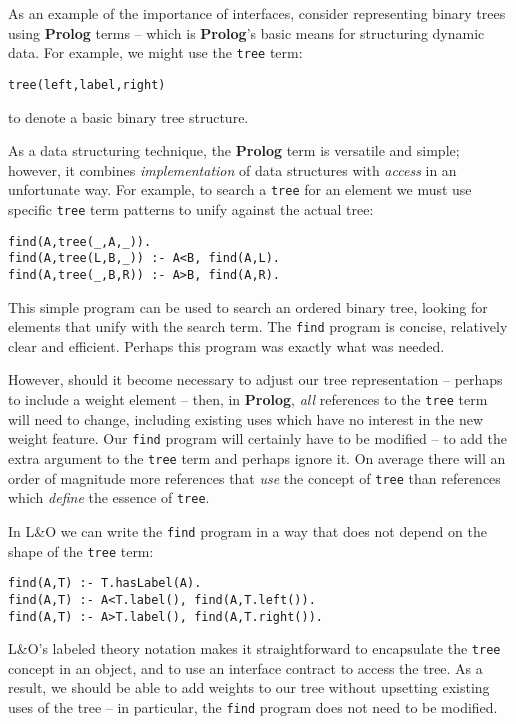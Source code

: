 As an example of the importance of interfaces, consider representing binary trees using  \textbf{Prolog} terms -- which is \textbf{Prolog}'s basic means for structuring dynamic data. For example, we might use the \verb+tree+ term:
\begin{verbatim}
tree(left,label,right)
\end{verbatim}
to denote a basic binary tree structure. 

As a data structuring technique, the \textbf{Prolog} term is versatile and simple; however, it combines \textit{implementation} of data structures with \textit{access} in an unfortunate way. For example, to search a \verb+tree+ for an element we must use specific \verb+tree+ term patterns to unify against the actual tree:
\begin{verbatim}
find(A,tree(_,A,_)).
find(A,tree(L,B,_)) :- A<B, find(A,L).
find(A,tree(_,B,R)) :- A>B, find(A,R).
\end{verbatim}
This simple program can be used to search an ordered binary tree, looking for elements that unify with the search term. The \verb+find+ program is concise, relatively clear and efficient. Perhaps this program was exactly what was needed.

However, should it become necessary to adjust our tree representation -- perhaps to include a weight element -- then, in \textbf{Prolog}, \textit{all} references to the \verb+tree+ term will need to change, including existing uses which have no interest in the new weight feature. Our \verb+find+ program will certainly have to be modified -- to add the extra argument to the \verb+tree+ term and perhaps ignore it. On average there will an order of magnitude more references that \textit{use} the concept of \verb+tree+ than references which \textit{define} the essence of \verb+tree+.

In L&O we can write the \verb+find+ program in a way that does not depend on the shape of the \verb+tree+ term:
\begin{verbatim}
find(A,T) :- T.hasLabel(A).
find(A,T) :- A<T.label(), find(A,T.left()).
find(A,T) :- A>T.label(), find(A,T.right()).
\end{verbatim}
L&O's labeled theory notation makes it straightforward to encapsulate the \verb+tree+ concept in an object, and to use an interface contract to access the tree. As a result, we should be able to add weights to our tree without upsetting existing uses of the tree -- in particular, the \verb+find+ program does not need to be modified.

